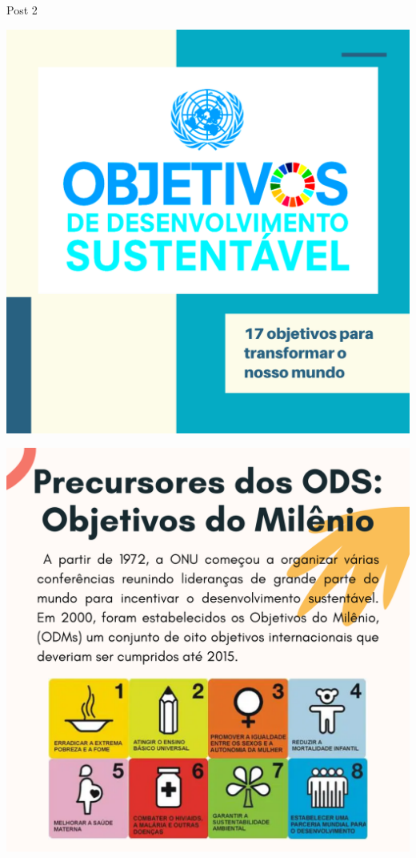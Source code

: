 \documentclass{beamer}
\begin{document}
	\begin{frame}{Post 2}
		\begin{minipage}{0.49\linewidth}
			\centering
			\includegraphics[width=\linewidth]{Post 2/1.png}
		\end{minipage}
		\hfill
		\begin{minipage}{0.49\linewidth}
			\centering
			\includegraphics[width=\linewidth]{Post 2/2.png}
		\end{minipage}
	\end{frame}
	
\end{document}
